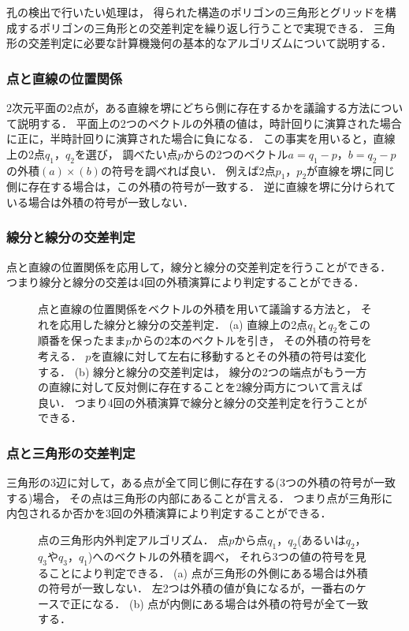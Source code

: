孔の検出で行いたい処理は，
得られた構造のポリゴンの三角形とグリッドを構成するポリゴンの三角形との交差判定を繰り返し行うことで実現できる．
三角形の交差判定に必要な計算機幾何の基本的なアルゴリズムについて説明する．

\subsubsection{点と直線の位置関係}
2次元平面の2点が，ある直線を堺にどちら側に存在するかを議論する方法について説明する．
平面上の2つのベクトルの外積の値は，時計回りに演算された場合に正に，半時計回りに演算された場合に負になる．
この事実を用いると，直線上の2点$q_1$，$q_2$を選び，
調べたい点$p$からの2つのベクトル$a=q_1-p$，$b=q_2-p$の外積$(a)\times(b)$の符号を調べれば良い．
例えば2点$p_1$，$p_2$が直線を堺に同じ側に存在する場合は，この外積の符号が一致する．
逆に直線を堺に分けられている場合は外積の符号が一致しない．

\subsubsection{線分と線分の交差判定}
点と直線の位置関係を応用して，線分と線分の交差判定を行うことができる．
つまり線分と線分の交差は4回の外積演算により判定することができる．

\begin{figure}
\centering

\caption{
    点と直線の位置関係をベクトルの外積を用いて議論する方法と，
    それを応用した線分と線分の交差判定．
    (a) 直線上の2点$q_1$と$q_2$をこの順番を保ったまま$p$からの2本のベクトルを引き，
        その外積の符号を考える．
        $p$を直線に対して左右に移動するとその外積の符号は変化する．
    (b) 線分と線分の交差判定は，
        線分の2つの端点がもう一方の直線に対して反対側に存在することを2線分両方について言えば良い．
        つまり4回の外積演算で線分と線分の交差判定を行うことができる．
}
\label{fig:segment_segment}
\end{figure}

\subsubsection{点と三角形の交差判定}
三角形の3辺に対して，ある点が全て同じ側に存在する(3つの外積の符号が一致する)場合，
その点は三角形の内部にあることが言える．
つまり点が三角形に内包されるか否かを3回の外積演算により判定することができる．

\begin{figure}
\centering

\caption{
    点の三角形内外判定アルゴリズム．
    点$p$から点$q_1$，$q_2$(あるいは$q_2$，$q_3$や$q_3$，$q_1$)へのベクトルの外積を調べ，
    それら3つの値の符号を見ることにより判定できる．
    (a) 点が三角形の外側にある場合は外積の符号が一致しない．
        左2つは外積の値が負になるが，一番右のケースで正になる．
    (b) 点が内側にある場合は外積の符号が全て一致する．
}
\label{fig:point_triangle}
\end{figure}

